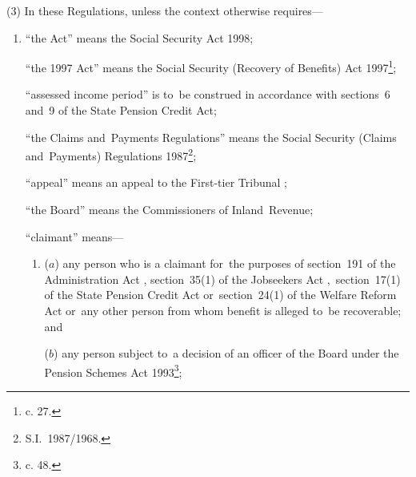 \documentclass[12pt,a4paper]{article}
\begin{document}
(3) In these Regulations, unless the context otherwise requires—
\begin{enumerate}\item[]
“the Act” means the Social Security Act 1998;

“the 1997 Act” means the Social Security (Recovery of Benefits) Act 1997\footnote{ c. 27.};


“assessed income period” is to~be construed in accordance with sections~6 and~9 of the State Pension Credit Act;

“the Claims and~Payments Regulations” means the Social Security (Claims and~Payments) Regulations 1987\footnote{\frenchspacing S.I.~1987/1968.};

“appeal” means an appeal to 
the First-tier Tribunal%
;

“the Board” means the Commissioners of Inland~Revenue;

“claimant” means—
\begin{enumerate}\item[]
($a$) any person who is a claimant for~the purposes of section~191 of the Administration Act%
, section~35(1) of the Jobseekers Act%
,~section~17(1) of the State Pension Credit Act or~section~24(1) of the Welfare Reform Act  %
or~any other person from whom benefit is alleged to~be recoverable; and

($b$) any person subject to~a decision of 
an officer of the Board  %
under the Pension Schemes Act 1993\footnote{ c. 48.};
\end{enumerate}


\end{enumerate}
\end{document}
